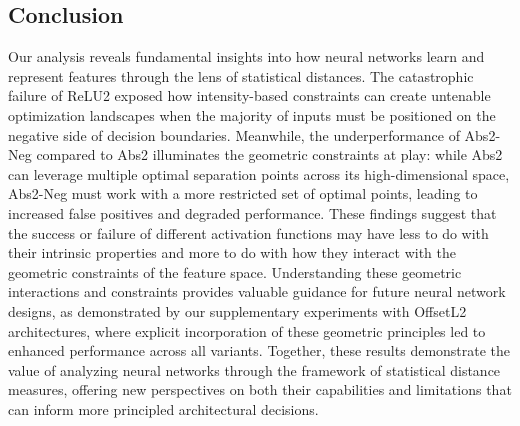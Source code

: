 \subsection{Conclusion}

Our analysis reveals fundamental insights into how neural networks learn and represent features through the lens of statistical distances. The catastrophic failure of ReLU2 exposed how intensity-based constraints can create untenable optimization landscapes when the majority of inputs must be positioned on the negative side of decision boundaries. Meanwhile, the underperformance of Abs2-Neg compared to Abs2 illuminates the geometric constraints at play: while Abs2 can leverage multiple optimal separation points across its high-dimensional space, Abs2-Neg must work with a more restricted set of optimal points, leading to increased false positives and degraded performance. These findings suggest that the success or failure of different activation functions may have less to do with their intrinsic properties and more to do with how they interact with the geometric constraints of the feature space. Understanding these geometric interactions and constraints provides valuable guidance for future neural network designs, as demonstrated by our supplementary experiments with OffsetL2 architectures, where explicit incorporation of these geometric principles led to enhanced performance across all variants. Together, these results demonstrate the value of analyzing neural networks through the framework of statistical distance measures, offering new perspectives on both their capabilities and limitations that can inform more principled architectural decisions.